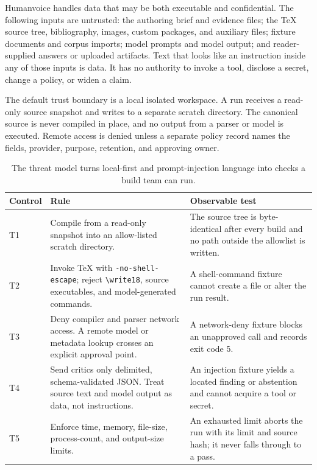 Humanvoice handles data that may be both executable and confidential. The
following inputs are untrusted: the authoring brief and evidence files; the
TeX source tree, bibliography, images, custom packages, and auxiliary files;
fixture documents and corpus imports; model prompts and model output; and
reader-supplied answers or uploaded artifacts. Text that looks like an
instruction inside any of those inputs is data. It has no authority to invoke a
tool, disclose a secret, change a policy, or widen a claim.

The default trust boundary is a local isolated workspace. A run receives a
read-only source snapshot and writes to a separate scratch directory. The
canonical source is never compiled in place, and no output from a parser or
model is executed. Remote access is denied unless a separate policy record
names the fields, provider, purpose, retention, and approving owner.

\begin{table}[H]
\centering
\small
\begin{tabularx}{\textwidth}{@{}p{}p{}L@{}}
\toprule
Control & Rule & Observable test \\
\midrule
T1 & Compile from a read-only snapshot into an allow-listed scratch directory. &
The source tree is byte-identical after every build and no path outside the
allowlist is written. \\
T2 & Invoke TeX with \texttt{-no-shell-escape}; reject
\texttt{\textbackslash write18},
source executables, and model-generated commands. & A shell-command fixture
cannot create a file or alter the run result. \\
T3 & Deny compiler and parser network access. A remote model or metadata lookup
crosses an explicit approval point. & A network-deny fixture blocks an
unapproved call and records exit code 5. \\
T4 & Send critics only delimited, schema-validated JSON. Treat source text and
model output as data, not instructions. & An injection fixture yields a
located finding or abstention and cannot acquire a tool or secret. \\
T5 & Enforce time, memory, file-size, process-count, and output-size limits. &
An exhausted limit aborts the run with its limit and source hash; it never
falls through to a pass. \\
\bottomrule
\end{tabularx}
\caption{The threat model turns local-first and prompt-injection language into
checks a build team can run.}
\label{tab:contract-threat-controls}
\end{table}

